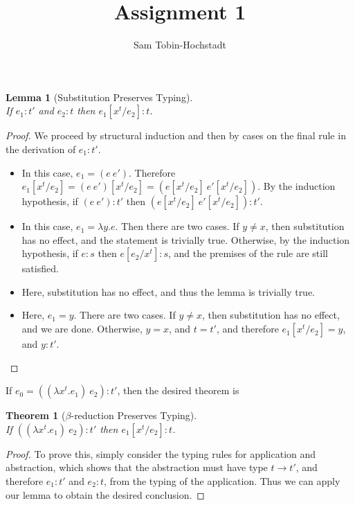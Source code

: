 \documentclass{article}
\newtheorem{theorem}{Theorem}
\newtheorem{lemma}{Lemma}
\newcommand{\proofcase}[1]{\item[Case {\textsc {#1}}:]}
\begin{document}
\title{Assignment 1}
\author{Sam Tobin-Hochstadt}

\maketitle

\begin{lemma}[Substitution Preserves Typing]\mbox{}\\
If $e_1 : t'$ and $e_2 : t$ then $e_1[x^t/e_2]:t$.
\end{lemma}

\begin{proof}
  We proceed by structural induction and then by cases on the final
  rule in the derivation of $e_1 : t'$.

\begin{itemize}
  \proofcase{T-App} In this case, $e_1 = (e\ e')$.  Therefore
  $e_1[x^t/e_2] = (e\ e')[x^t/e_2] = (e[x^t/e_2]\ e'[x^t/e_2])$.  By the
  induction hypothesis, if $(e\ e') : t'$ then $(e[x^t/e_2]\
  e'[x^t/e_2]) : t'$.
  \proofcase{T-Abs} In this case, $e_1 = \lambda y.e$.  Then there are
  two cases.  If $y \neq x$, then substitution has no effect, and the
  statement is trivially true.  Otherwise, by the induction
  hypothesis, if $e : s$ then $e[e_2/x^t] : s$, and the premises of
  the rule are still satisfied.
  \proofcase{T-Const}  Here, substitution has no effect, and thus the
  lemma is trivially true.  
  \proofcase{T-Var}  Here, $e_1 = y$.  There are two cases.  If $y
  \neq x$, then substitution has no effect, and we are done.
  Otherwise, $y = x$, and $t = t'$, and therefore $e_1[x^t/e_2] = y$,
  and $y : t'$.  
\end{itemize}

\end{proof}

If $e_0 = ((\lambda x^t.e_1)\ e_2) : t'$, then the desired theorem is

\begin{theorem}[$\beta$-reduction Preserves Typing] \mbox{}\\
If $((\lambda x^t.e_1)\ e_2) : t'$ then $e_1[x^t/e_2]:t$.
\end{theorem}

\begin{proof}
To prove this, simply consider the typing rules for application and abstraction, which
shows that the abstraction must have type $t \rightarrow t'$, and therefore
$e_1 : t'$ and $e_2 : t$, from the typing of the application.  Thus we
can apply our lemma to obtain the desired conclusion.
\end{proof}
\end{document}
